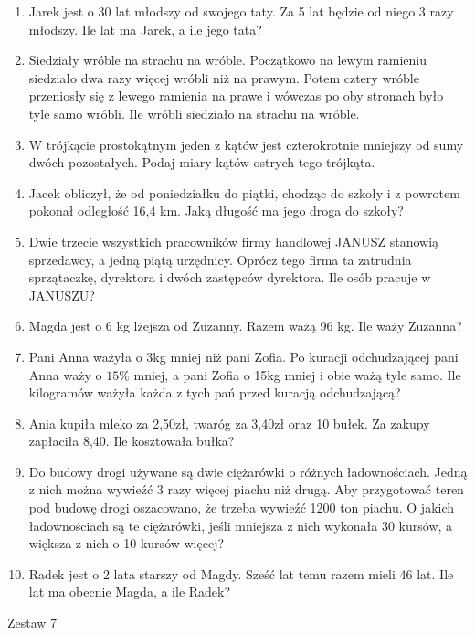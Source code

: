 \documentclass[12pt,a4paper]{article}
\begin{document}
\begin{enumerate}[1.]
	\item Jarek jest o 30 lat młodszy od swojego taty. Za 5 lat będzie od niego 3 razy młodszy. Ile lat ma Jarek, a ile jego tata?
	\item Siedziały wróble na strachu na wróble. Początkowo na lewym ramieniu siedziało dwa razy więcej wróbli niż na prawym. Potem cztery wróble przeniosły się z lewego ramienia na prawe i wówczas po oby stronach było tyle samo wróbli. Ile wróbli siedziało na strachu na wróble.
	\item W trójkącie prostokątnym jeden z kątów jest czterokrotnie mniejszy od sumy dwóch pozostałych. Podaj miary kątów ostrych tego trójkąta.
	\item Jacek obliczył, że od poniedziałku do piątki, chodząc do szkoły i z powrotem pokonał odległość 16,4 km. Jaką długość ma jego droga do szkoły?
	\item Dwie trzecie wszystkich pracowników firmy handlowej JANUSZ stanowią sprzedawcy, a jedną piątą urzędnicy. Oprócz tego firma ta zatrudnia sprzątaczkę, dyrektora i dwóch zastępców dyrektora. Ile osób pracuje w JANUSZU?
	\item Magda jest o 6 kg lżejsza od Zuzanny. Razem ważą 96 kg. Ile waży Zuzanna?
	\item Pani Anna ważyła o 3kg mniej niż pani Zofia. Po kuracji odchudzającej pani Anna waży o $15\%$ mniej, a pani Zofia o 15kg mniej i obie ważą tyle samo. Ile kilogramów ważyła każda z tych pań przed kuracją odchudzającą?
	\item Ania kupiła mleko za 2,50zł, twaróg za 3,40zł oraz 10 bułek. Za zakupy zapłaciła 8,40. Ile kosztowała bułka?
	\item Do budowy drogi używane są dwie ciężarówki o różnych ładownościach. Jedną z nich można
	wywieźć 3 razy więcej piachu niż drugą. Aby przygotować teren pod budowę drogi
	oszacowano, że trzeba wywieźć 1200 ton piachu. O jakich ładownościach są te ciężarówki,
	jeśli mniejsza z nich wykonała 30 kursów, a większa z nich o 10 kursów więcej?
	\item Radek jest o 2 lata starszy od Magdy. Sześć lat temu razem mieli 46 lat. Ile lat ma obecnie Magda, a ile Radek?
\end{enumerate}
\newpage
\LARGE \begin{center}
	Zestaw 7
\end{center}
\normalsize 
\end{document}
